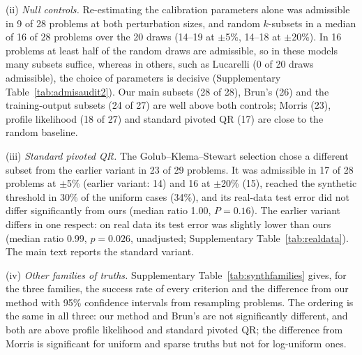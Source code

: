 (ii) \emph{Null controls.} Re-estimating the calibration parameters alone was admissible in 9 of 28 problems at both perturbation sizes, and random $k$-subsets in a median of 16 of 28 problems over the 20 draws (14--19 at $\pm$5\%, 14--18 at $\pm$20\%). In 16 problems at least half of the random draws are admissible, so in these models many subsets suffice, whereas in others, such as Lucarelli (0 of 20 draws admissible), the choice of parameters is decisive (Supplementary Table~\ref{tab:admisaudit2}). Our main subsets (28 of 28), Brun's (26) and the training-output subsets (24 of 27) are well above both controls; Morris (23), profile likelihood (18 of 27) and standard pivoted QR (17) are close to the random baseline.

(iii) \emph{Standard pivoted QR.} The Golub--Klema--Stewart selection chose a different subset from the earlier variant in 23 of 29 problems. It was admissible in 17 of 28 problems at $\pm$5\% (earlier variant: 14) and 16 at $\pm$20\% (15), reached the synthetic threshold in 30\% of the uniform cases (34\%), and its real-data test error did not differ significantly from ours (median ratio 1.00, $P=0.16$). The earlier variant differs in one respect: on real data its test error was slightly lower than ours (median ratio 0.99, $p=0.026$, unadjusted; Supplementary Table~\ref{tab:realdata}). The main text reports the standard variant.

(iv) \emph{Other families of truths.} Supplementary Table~\ref{tab:synthfamilies} gives, for the three families, the success rate of every criterion and the difference from our method with 95\% confidence intervals from resampling problems. The ordering is the same in all three: our method and Brun's are not significantly different, and both are above profile likelihood and standard pivoted QR; the difference from Morris is significant for uniform and sparse truths but not for log-uniform ones.



\begin{table}[ht]
\centering\scriptsize
\caption{\textbf{Synthetic prediction for three families of truths.} Fraction of the cases with signal (common to all criteria of each block) in which $e_{\mathrm{pred}}\le\tau_e$; difference between the reference and each criterion in percentage points, with a 95\% confidence interval from resampling whole problems (10,000 replicates) and the Holm-adjusted two-sided $P$ over the four existing criteria (the earlier QR variant and the comparison between our two selections are unadjusted). Uniform: $\theta^\ast=\theta_0(1+0.2u)$, 20 seeds; log-uniform: $\theta^\ast_j=\theta_{0,j}10^{v_j}$ with $v_j$ uniform in $[-0.3,0.3]$, ten seeds; sparse: 15\% of the estimable parameters changed by $\pm$50\%, ten seeds.}\label{tab:synthfamilies}

\end{table}

